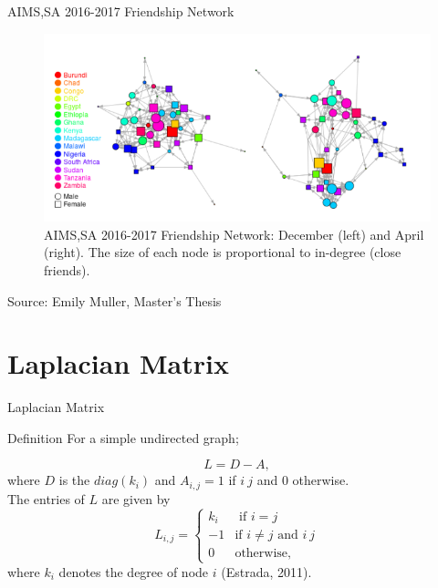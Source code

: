 \documentclass{beamer}
\begin{document}
\begin{frame}{AIMS,SA 2016-2017 Friendship Network}
	\begin{figure}[!h]
		\includegraphics[width= \textwidth]{images/AIMS,SouthAfricaNetwork.png}
		\caption{AIMS,SA 2016-2017 Friendship Network: December (left) and April (right). The size of each node is proportional to
			in-degree (close friends).}
	\end{figure}
Source: Emily Muller, Master's Thesis
\end{frame}

\section{Laplacian Matrix}
\begin{frame}{Laplacian Matrix}
	\begin{block}{Definition}
		For a simple undirected graph;
		
			\begin{equation}
			L= D-A,
			\end{equation} 
		where $D$ is the $diag(k_i)$ and $A_{i,j}=1$ if $i~j$ and $0$ otherwise.\\
		\vspace{0.5 cm}
		The entries of $L$ are given by\\
    	\begin{equation}
    	L_{i,j} = \begin{cases}
    	k_i & \text{ if }  i=j\\
    	-1  & \text{if } i \neq j \text{ and } i ~ j \\
    	0 & \text{otherwise},
    	\end{cases}
    	\end{equation}
    	where $k_i$ denotes the degree of node $i$ (Estrada, 2011).
    \end{block}
\end{frame}
\end{document}
